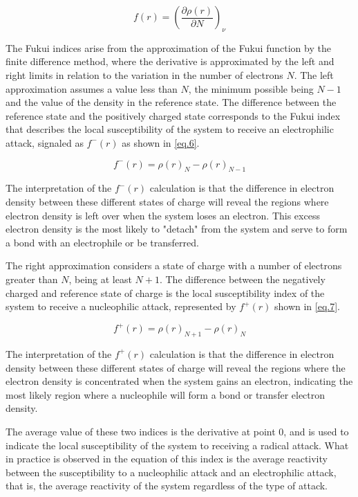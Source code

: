 \documentclass[a4paper,11pt]{refart}
\begin{document}
	\begin{equation}
	f(r) = \left(\frac{\partial \rho(r)}{\partial N} \right)_\nu
	\label{eq.5}
	\end{equation}

	The Fukui indices arise from the approximation of the Fukui function by the finite difference method, where the derivative is approximated by the left and right limits in relation to the variation in the number of electrons $N$. The left approximation assumes a value less than $N$, the minimum possible being $N-1$ and the value of the density in the reference state. The difference between the reference state and the positively charged state corresponds to the Fukui index that describes the local susceptibility of the system to receive an electrophilic attack, signaled as $f^{-}(r)$ as shown in \autoref{eq.6}.

	\begin{equation}
	f^{-}(r) = \rho(r)_{N} -\rho(r)_{N-1}
	\label{eq.6}
	\end{equation}

	The interpretation of the $f^{-}(r)$ calculation is that the difference in electron density between these different states of charge will reveal the regions where electron density is left over when the system loses an electron. This excess electron density is the most likely to "detach" from the system and serve to form a bond with an electrophile or be transferred.

	The right approximation considers a state of charge with a number of electrons greater than $N$, being at least $N+1$. The difference between the negatively charged and reference state of charge is the local susceptibility index of the system to receive a nucleophilic attack, represented by $f^{+}(r)$ shown in \autoref{eq.7}.

	\begin{equation}
	f^{+}(r) = \rho(r)_{N+1} -\rho(r)_{N}
	\label{eq.7}
	\end{equation}

	The interpretation of the $f^{+}(r)$ calculation is that the difference in electron density between these different states of charge will reveal the regions where the electron density is concentrated when the system gains an electron, indicating the most likely region where a nucleophile will form a bond or transfer electron density.

	The average value of these two indices is the derivative at point 0, and is used to indicate the local susceptibility of the system to receiving a radical attack. What in practice is observed in the equation of this index is the average reactivity between the susceptibility to a nucleophilic attack and an electrophilic attack, that is, the average reactivity of the system regardless of the type of attack.
\end{document}
